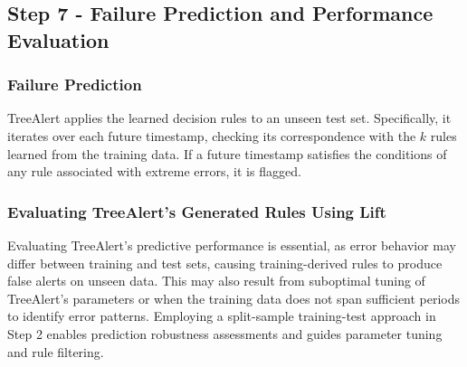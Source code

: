 \documentclass[12pt]{article}
\begin{document}



\subsection{Step 7 - Failure Prediction and Performance Evaluation}

\subsubsection{Failure Prediction}

TreeAlert applies the learned decision rules to an unseen test set. Specifically, it iterates over each future timestamp, checking its correspondence with the $k$ rules learned from the training data. If a future timestamp satisfies the conditions of any rule associated with extreme errors, it is flagged.

\subsubsection{Evaluating TreeAlert’s Generated Rules Using Lift}
\label{Sup-A}

Evaluating TreeAlert's predictive performance is essential, as error behavior may differ between training and test sets, causing training-derived rules to produce false alerts on unseen data. This may also result from suboptimal tuning of TreeAlert’s parameters or when the training data does not span sufficient periods to identify error patterns. Employing a split-sample training-test approach in Step 2 enables prediction robustness assessments and guides parameter tuning and rule filtering. 
\end{document}
